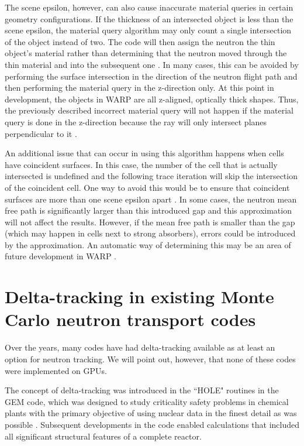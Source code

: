 The scene epsilon, however, can also cause inaccurate material queries in certain geometry configurations.
If the thickness of an intersected object is less than the scene epsilon, the material query algorithm may
only count a single intersection of the object instead of two. The code will then assign the neutron the 
thin object's material rather than determining that the neutron moved through the thin material and into the subsequent one \cite{warp2015}. In many cases, this can be avoided by performing the
surface intersection in the direction of the neutron flight path and then performing the material query in
the z-direction only. At this point in development, the objects in WARP are all z-aligned, optically
thick shapes. Thus, the previously described incorrect material query will not happen if the material 
query is done in the z-direction because the ray will only intersect planes perpendicular to it 
\cite{warp2015}.

An additional issue that can occur in using this algorithm happens when cells have coincident surfaces. In
this case, the number of the cell that is actually intersected is undefined and the following trace 
iteration will skip the intersection of the coincident cell. One way to avoid this would be to ensure that
coincident surfaces are more than one scene epsilon apart \cite{warp2015}. In some cases, the
neutron mean free path is significantly larger than this introduced gap and this approximation will not
affect the results. However, if the mean free path is smaller than the gap (which may happen in cells next
to strong absorbers), errors could be introduced by the approximation. An automatic way of determining
this may be an area of future development in WARP \cite{warp2015}. 

\section{Delta-tracking in existing Monte Carlo neutron transport codes}

Over the years, many codes have had delta-tracking available as at least an option for neutron tracking. 
We will point out, however, that none of these codes were implemented on GPUs. 

The concept of delta-tracking was introduced in the ``HOLE" routines in the GEM code, which was designed 
to study criticality safety problems in chemical plants with the primary objective of using nuclear data 
in the finest detail as was possible \cite{wc}. Subsequent developments in the code enabled calculations 
that included all significant structural features of a complete reactor.


